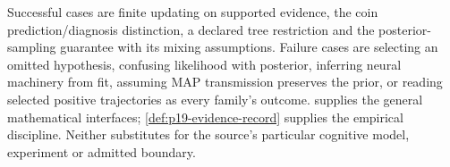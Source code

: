 Successful cases are finite updating on supported evidence, the coin
prediction/diagnosis distinction, a declared tree restriction and the
posterior-sampling guarantee with its mixing assumptions. Failure cases
are selecting an omitted hypothesis, confusing likelihood with posterior,
inferring neural machinery from fit, assuming MAP transmission preserves
the prior, or reading selected positive trajectories as every family's
outcome. 
supplies the general mathematical interfaces; \cref{def:p19-evidence-record}
supplies the empirical discipline. Neither substitutes for the source's
particular cognitive model, experiment or admitted boundary.
